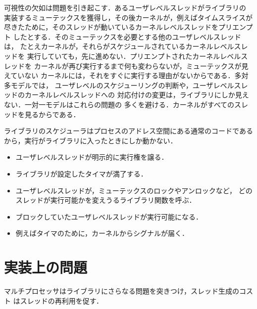 \documentclass[../main.tex]{subfiles}
\begin{document}
可視性の欠如は問題を引き起こす．あるユーザレベルスレッドがライブラリの
実装するミューテックスを獲得し，その後カーネルが，例えばタイムスライスが
尽きたために，そのスレッドが動いているカーネルレベルスレッドをプリエンプト
したとする．そのミューテックスを必要とする他のユーザレベルスレッドは，
たとえカーネルが，それらがスケジュールされているカーネルレベルスレッドを
実行していても，先に進めない．プリエンプトされたカーネルレベルスレッドを
カーネルが再び実行するまで何も変わらないが，ミューテックスが見えていない
カーネルには，それをすぐに実行する理由がないからである．多対多モデルでは，
ユーザレベルのスケジューリングの判断や，ユーザレベルスレッドのカーネルレベルスレッドへの
対応付けの変更は，ライブラリにしか見えない．一対一モデルはこれらの問題の
多くを避ける．カーネルがすべてのスレッドを見るからである．

ライブラリのスケジューラはプロセスのアドレス空間にある通常のコードである
から，実行がライブラリに入ったときにしか動かない．
\begin{itemize}
  \item ユーザレベルスレッドが明示的に実行権を譲る．
  \item ライブラリが設定したタイマが満了する．
  \item ユーザレベルスレッドが，ミューテックスのロックやアンロックなど，
    どのスレッドが実行可能かを変えうるライブラリ関数を呼ぶ．
  \item ブロックしていたユーザレベルスレッドが実行可能になる．
  \item 例えばタイマのために，カーネルからシグナルが届く．
\end{itemize}

\section{実装上の問題}
\label{sec:l05-issues}

マルチプロセッサはライブラリにさらなる問題を突きつけ，スレッド生成のコスト
はスレッドの再利用を促す．
\end{document}
